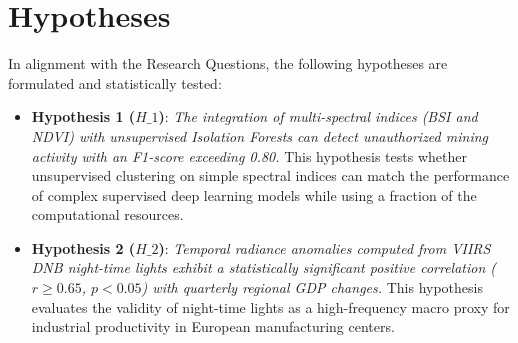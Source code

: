\section{Hypotheses}
In alignment with the Research Questions, the following hypotheses are formulated and statistically tested:
\begin{itemize}
  \item \textbf{Hypothesis 1 ($H\_1$)}: \textit{The integration of multi-spectral indices (BSI and NDVI) with unsupervised Isolation Forests can detect unauthorized mining activity with an F1-score exceeding 0.80.}
    This hypothesis tests whether unsupervised clustering on simple spectral indices can match the performance of complex supervised deep learning models while using a fraction of the computational resources.
  \item \textbf{Hypothesis 2 ($H\_2$)}: \textit{Temporal radiance anomalies computed from VIIRS DNB night-time lights exhibit a statistically significant positive correlation ($r \ge 0.65$, $p < 0.05$) with quarterly regional GDP changes.}
    This hypothesis evaluates the validity of night-time lights as a high-frequency macro proxy for industrial productivity in European manufacturing centers.

\end{itemize}
